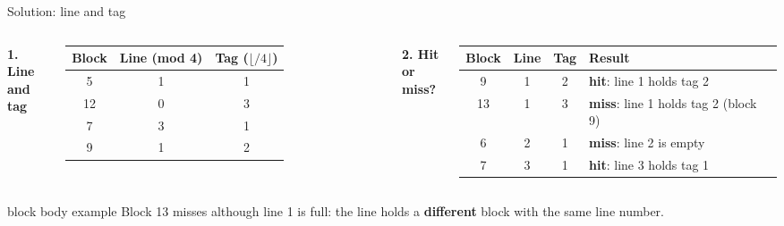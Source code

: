 \documentclass[aspectratio=169,10pt]{beamer}
\newcommand{\keymsg}[1]{%
  \begin{beamercolorbox}[rounded=true,sep=0.1cm,wd=\textwidth]{block body example}
    \centering\footnotesize #1
  \end{beamercolorbox}}
\begin{document}
\begin{frame}{Solution: line and tag}
  \begin{columns}[T,onlytextwidth]
      \centering\footnotesize
      \textbf{1. Line and tag}\\[0.1cm]
      \renewcommand{\arraystretch}{1.2}
      \begin{tabular}{ccc}
        \toprule
        \textbf{Block} & \textbf{Line} (mod 4) & \textbf{Tag} ($\lfloor / 4 \rfloor$) \\
        \midrule
        5 & 1 & 1 \\ 12 & 0 & 3 \\ 7 & 3 & 1 \\ 9 & 1 & 2 \\
        \bottomrule
      \end{tabular}
      \centering\footnotesize
      \textbf{2. Hit or miss?}\\[0.1cm]
      \renewcommand{\arraystretch}{1.2}
      \begin{tabular}{cccl}
        \toprule
        \textbf{Block} & \textbf{Line} & \textbf{Tag} & \textbf{Result} \\
        \midrule
        9 & 1 & 2 & \textcolor{HitGreen}{\textbf{hit}}: line 1 holds tag 2 \\
        13 & 1 & 3 & \textcolor{MissRed}{\textbf{miss}}: line 1 holds tag 2 (block 9) \\
        6 & 2 & 1 & \textcolor{MissRed}{\textbf{miss}}: line 2 is empty \\
        7 & 3 & 1 & \textcolor{HitGreen}{\textbf{hit}}: line 3 holds tag 1 \\
        \bottomrule
      \end{tabular}
  \end{columns}
  \vfill
  \keymsg{Block 13 misses although line 1 is full: the line holds a \textbf{different} block with the same line number.}
\end{frame}
\end{document}
